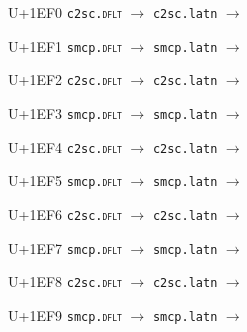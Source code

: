 \documentclass{article}
\begin{document}
\begin{substitutions}
\goodbreak

U+1EF0  \linebreak
    \texttt{c2sc.\textsc{dflt}} $\to$  \linebreak
    \texttt{c2sc.latn} $\to$  

\goodbreak

U+1EF1  \linebreak
    \texttt{smcp.\textsc{dflt}} $\to$  \linebreak
    \texttt{smcp.latn} $\to$  

\goodbreak

U+1EF2  \linebreak
    \texttt{c2sc.\textsc{dflt}} $\to$  \linebreak
    \texttt{c2sc.latn} $\to$  

\goodbreak

U+1EF3  \linebreak
    \texttt{smcp.\textsc{dflt}} $\to$  \linebreak
    \texttt{smcp.latn} $\to$  

\goodbreak

U+1EF4  \linebreak
    \texttt{c2sc.\textsc{dflt}} $\to$  \linebreak
    \texttt{c2sc.latn} $\to$  

\goodbreak

U+1EF5  \linebreak
    \texttt{smcp.\textsc{dflt}} $\to$  \linebreak
    \texttt{smcp.latn} $\to$  

\goodbreak

U+1EF6  \linebreak
    \texttt{c2sc.\textsc{dflt}} $\to$  \linebreak
    \texttt{c2sc.latn} $\to$  

\goodbreak

U+1EF7  \linebreak
    \texttt{smcp.\textsc{dflt}} $\to$  \linebreak
    \texttt{smcp.latn} $\to$  

\goodbreak

U+1EF8  \linebreak
    \texttt{c2sc.\textsc{dflt}} $\to$  \linebreak
    \texttt{c2sc.latn} $\to$  

\goodbreak

U+1EF9  \linebreak
    \texttt{smcp.\textsc{dflt}} $\to$  \linebreak
    \texttt{smcp.latn} $\to$  

\goodbreak

\end{substitutions}
\end{document}
